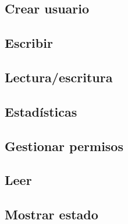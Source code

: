 \subsection{Crear usuario}
\subsection{Escribir}
\subsection{Lectura/escritura}
\subsection{Estadísticas}
\subsection{Gestionar permisos}
\subsection{Leer}
\subsection{Mostrar estado}


